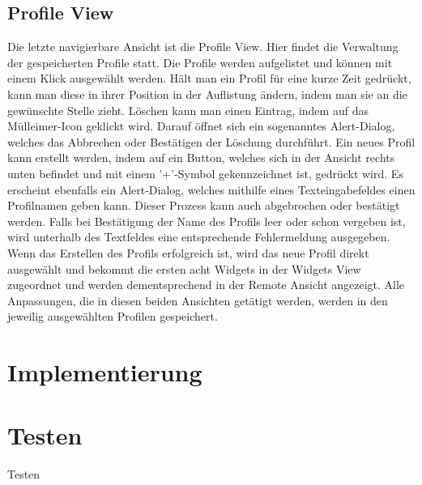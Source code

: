 \subsection{Profile View}
Die letzte navigierbare Ansicht ist die Profile View. Hier findet die Verwaltung der gespeicherten Profile statt. Die Profile werden aufgelistet und können mit einem Klick ausgewählt werden. Hält man ein Profil für eine kurze Zeit gedrückt, kann man diese in ihrer Position in der Auflistung ändern, indem man sie an die gewünschte Stelle zieht. Löschen kann man einen Eintrag, indem auf das Mülleimer-Icon geklickt wird. Darauf öffnet sich ein sogenanntes Alert-Dialog, welches das Abbrechen oder Bestätigen der Löschung durchführt. Ein neues Profil kann erstellt werden, indem auf ein Button, welches sich in der Ansicht rechts unten befindet und mit einem '+'-Symbol gekennzeichnet ist, gedrückt wird. Es erscheint ebenfalls ein Alert-Dialog, welches mithilfe eines Texteingabefeldes einen Profilnamen geben kann. Dieser Prozess kann auch abgebrochen oder bestätigt werden. Falls bei Bestätigung der Name des Profils leer oder schon vergeben ist, wird unterhalb des Textfeldes eine entsprechende Fehlermeldung ausgegeben. Wenn das Erstellen des Profils erfolgreich ist, wird das neue Profil direkt ausgewählt und bekommt die ersten acht Widgets in der Widgets View zugeordnet und werden dementsprechend in der Remote Ansicht angezeigt. Alle Anpassungen, die in diesen beiden Ansichten getätigt werden, werden in den jeweilig ausgewählten Profilen gespeichert.

\section{Implementierung}


\section{Testen}
Testen